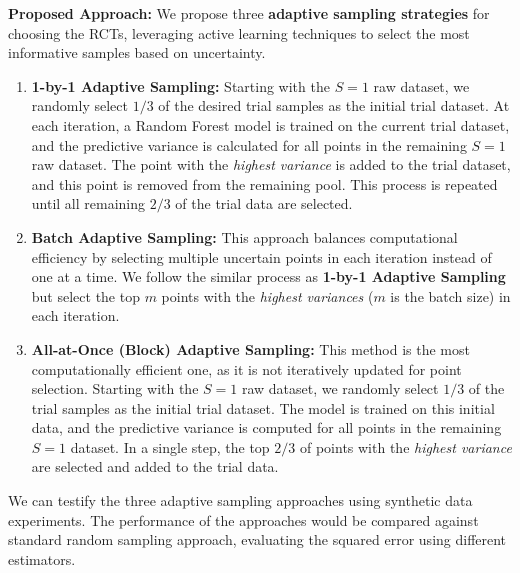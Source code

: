 \documentclass[12pt, oneside]{amsart}
\theoremstyle{definition}
\theoremstyle{remark}
\numberwithin{equation}{section}
\begin{document}
\textbf{Proposed Approach:} We propose three \textbf{adaptive sampling strategies} for choosing the RCTs, leveraging active learning techniques to select the most informative samples based on uncertainty.
\begin{enumerate}
    \item \textbf{1-by-1 Adaptive Sampling:} Starting with the $S = 1$ raw dataset, we randomly select $1/3$ of the desired trial samples as the initial trial dataset. At each iteration, a Random Forest model is trained on the current trial dataset, and the predictive variance is calculated for all points in the remaining $S = 1$ raw dataset. The point with the \textit{highest variance} is added to the trial dataset, and this point is removed from the remaining pool. This process is repeated until all remaining $2/3$ of the trial data are selected. 

    \item \textbf{Batch Adaptive Sampling:} This approach balances computational efficiency by selecting multiple uncertain points in each iteration instead of one at a time. We follow the similar process as \textbf{1-by-1 Adaptive Sampling} but select the top $m$ points with the \textit{highest variances} ($m$ is the batch size) in each iteration. 

    \item \textbf{All-at-Once (Block) Adaptive Sampling:} This method is the most computationally efficient one, as it is not iteratively updated for point selection. Starting with the $S = 1$ raw dataset, we randomly select $1/3$ of the trial samples as the initial trial dataset. The model is trained on this initial data, and the predictive variance is computed for all points in the remaining $S = 1$ dataset. In a single step, the top $2/3$ of points with the \textit{highest variance} are selected and added to the trial data. 
\end{enumerate}

We can testify the three adaptive sampling approaches using synthetic data experiments. The performance of the approaches would be compared against standard random sampling approach, evaluating the squared error using different estimators.
\end{document}
